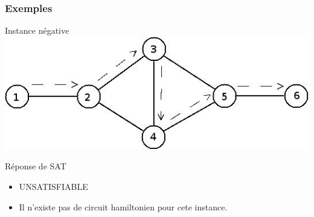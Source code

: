 \begin{frame}
\frametitle{Exemples}
\begin{block}{Instance n\'egative}
\includegraphics[scale=0.3]{negatif.jpeg}
\end{block}
\begin{block}{R\'eponse de SAT}
  \begin{itemize}
  \item UNSATISFIABLE
  \item Il n'existe pas de circuit hamiltonien pour cete instance.
  \end{itemize}
\end{block}
\end{frame}